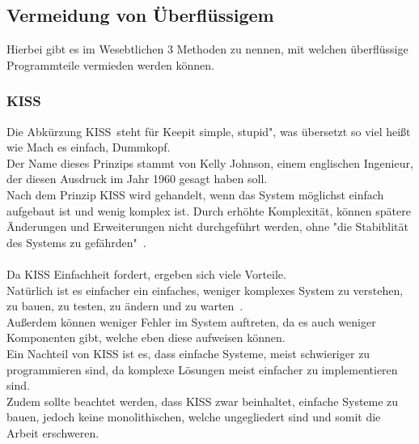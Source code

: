 \documentclass[a4paper, 10pt]{scrartcl}
\begin{document}
\subsection{Vermeidung von Überflüssigem}
Hierbei gibt es im Wesebtlichen 3 Methoden zu nennen, mit welchen überflüssige Programmteile vermieden werden können.


\subsubsection{KISS}
Die Abkürzung \glqq KISS\grqq \ steht für \glqq Keep\grqq it simple, stupid", was übersetzt so viel heißt wie \glqq Mach es einfach, Dummkopf\grqq. \\
Der Name dieses Prinzips stammt von Kelly Johnson, einem englischen Ingenieur, der diesen Ausdruck im Jahr 1960 gesagt haben soll. \citep {goll_entwurfsprinzipien}  \\
Nach dem Prinzip KISS wird gehandelt, wenn das System möglichst einfach aufgebaut ist und wenig komplex ist. Durch erhöhte Komplexität, können spätere Änderungen und Erweiterungen nicht durchgeführt werden, ohne "die Stabiblität des Systems zu gefährden"\  \cite{goll_entwurfsprinzipien}.\\\\
Da KISS Einfachheit fordert, ergeben sich viele Vorteile. \\
Natürlich ist es einfacher ein einfaches, weniger komplexes System  \glqq zu verstehen, zu bauen, zu testen, zu ändern und zu warten\grqq\ \cite{goll_entwurfsprinzipien}.\\
Außerdem können weniger Fehler im System auftreten, da es auch weniger Komponenten gibt, welche eben diese aufweisen können.\\
Ein Nachteil von KISS ist es, dass einfache Systeme, meist schwieriger zu programmieren sind, da komplexe Lösungen meist einfacher zu implementieren sind.\\
Zudem sollte beachtet werden, dass KISS zwar beinhaltet, einfache Systeme zu bauen, jedoch keine monolithischen, welche ungegliedert sind und somit die Arbeit erschweren. \citep{goll_entwurfsprinzipien}
\end{document}
